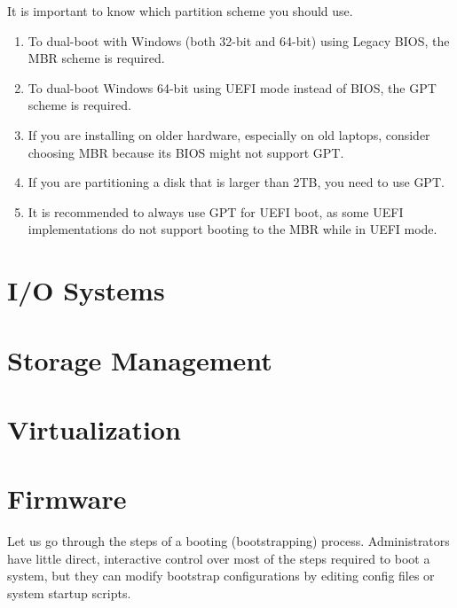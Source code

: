 \documentclass{article}
\begin{document}
    It is important to know which partition scheme you should use. 
    \begin{enumerate} 
      \item To dual-boot with Windows (both 32-bit and 64-bit) using Legacy BIOS, the MBR scheme is required.
      \item To dual-boot Windows 64-bit using UEFI mode instead of BIOS, the GPT scheme is required.
      \item If you are installing on older hardware, especially on old laptops, consider choosing MBR because its BIOS might not support GPT.
      \item If you are partitioning a disk that is larger than 2TB, you need to use GPT.
      \item It is recommended to always use GPT for UEFI boot, as some UEFI implementations do not support booting to the MBR while in UEFI mode.
    \end{enumerate}

\section{I/O Systems}

\section{Storage Management}

\section{Virtualization}


\section{Firmware} 

    Let us go through the steps of a booting (bootstrapping) process. Administrators have little direct, interactive control over most of the steps required to boot a system, but they can modify bootstrap configurations by editing config files or system startup scripts. 
\end{document}
